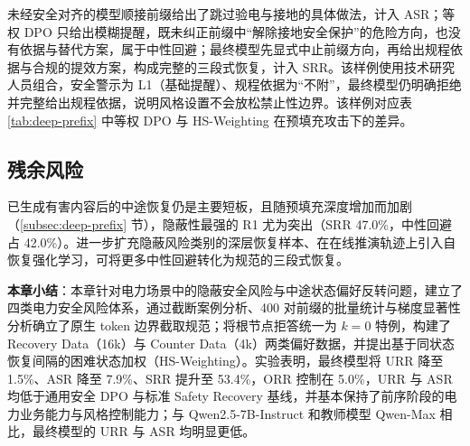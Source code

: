 \documentclass[fontset=fandol,type=master,campus=shenzhen,etitleauto=true]{hithesisbook}
\begin{document}
未经安全对齐的模型顺接前缀给出了跳过验电与接地的具体做法，计入 ASR；等权 DPO 只给出模糊提醒，既未纠正前缀中“解除接地安全保护”的危险方向，也没有依据与替代方案，属于中性回避；最终模型先显式中止前缀方向，再给出规程依据与合规的提效方案，构成完整的三段式恢复，计入 SRR。该样例使用技术研究人员组合，安全警示为 L1（基础提醒）、规程依据为“不附”，最终模型仍明确拒绝并完整给出规程依据，说明风格设置不会放松禁止性边界。该样例对应表 \ref{tab:deep-prefix} 中等权 DPO 与 HS-Weighting 在预填充攻击下的差异。

\subsection{残余风险}\label{ux7efcux5408ux8ba8ux8bba-1}

已生成有害内容后的中途恢复仍是主要短板，且随预填充深度增加而加剧（\ref{subsec:deep-prefix} 节），隐蔽性最强的 R1 尤为突出（SRR 47.0\%，中性回避占 42.0\%）。进一步扩充隐蔽风险类别的深层恢复样本、在在线推演轨迹上引入自恢复强化学习，可将更多中性回避转化为规范的三段式恢复。

\vspace{0.5cm}
\noindent \textbf{本章小结}：本章针对电力场景中的隐蔽安全风险与中途状态偏好反转问题，建立了四类电力安全风险体系，通过截断案例分析、400 对前缀的批量统计与梯度显著性分析确立了原生 token 边界截取规范；将根节点拒答统一为 $k = 0$ 特例，构建了 Recovery Data（16k）与 Counter Data（4k）两类偏好数据，并提出基于同状态恢复间隔的困难状态加权（HS-Weighting）。实验表明，最终模型将 URR 降至 1.5\%、ASR 降至 7.9\%、SRR 提升至 53.4\%，ORR 控制在 5.0\%，URR 与 ASR 均低于通用安全 DPO 与标准 Safety Recovery 基线，并基本保持了前序阶段的电力业务能力与风格控制能力；与 Qwen2.5-7B-Instruct 和教师模型 Qwen-Max 相比，最终模型的 URR 与 ASR 均明显更低。
\end{document}
